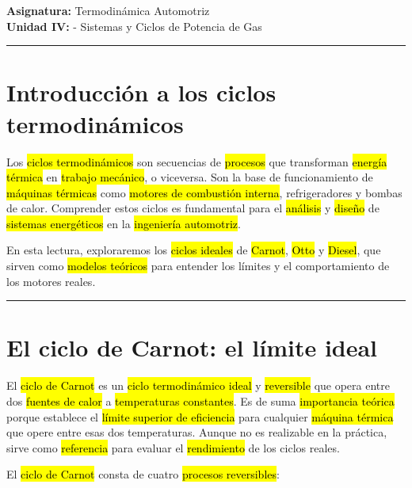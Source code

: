 \documentclass{article}
\begin{document}
	
	
	\textbf{Asignatura:} Termodinámica Automotriz \\
	\textbf{Unidad IV:} - Sistemas y Ciclos de Potencia de Gas
	
	\vspace{5mm}
	\hrule
	\vspace{5mm}

\section*{Introducción a los ciclos termodinámicos}

Los \hl{ciclos termodinámicos} son secuencias de \hl{procesos} que transforman \hl{energía térmica} en \hl{trabajo mecánico}, o viceversa. Son la base de funcionamiento de \hl{máquinas térmicas} como \hl{motores de combustión interna}, refrigeradores y bombas de calor. Comprender estos ciclos es fundamental para el \hl{análisis} y \hl{diseño} de \hl{sistemas energéticos} en la \hl{ingeniería automotriz}.

En esta lectura, exploraremos los \hl{ciclos ideales} de \hl{Carnot}, \hl{Otto} y \hl{Diesel}, que sirven como \hl{modelos teóricos} para entender los límites y el comportamiento de los motores reales.
\vspace{0.5cm}
\hrule
\vspace{0.5cm}

\section{El ciclo de Carnot: el límite ideal}

El \hl{ciclo de Carnot} es un \hl{ciclo termodinámico ideal} y \hl{reversible} que opera entre dos \hl{fuentes de calor} a \hl{temperaturas constantes}. Es de suma \hl{importancia teórica} porque establece el \hl{límite superior de eficiencia} para cualquier \hl{máquina térmica} que opere entre esas dos temperaturas. Aunque no es realizable en la práctica, sirve como \hl{referencia} para evaluar el \hl{rendimiento} de los ciclos reales.

El \hl{ciclo de Carnot} consta de cuatro \hl{procesos reversibles}:
\end{document}
